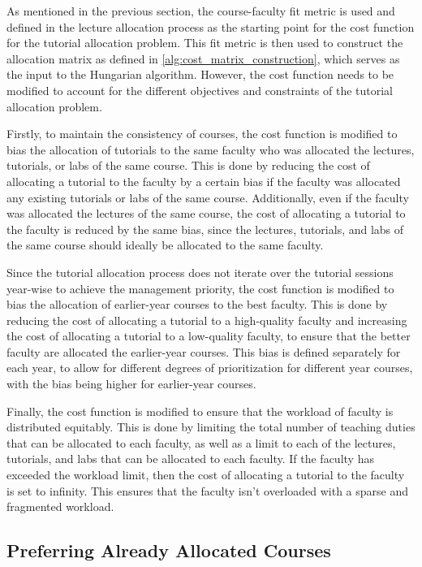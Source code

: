 As mentioned in the previous section, the course-faculty fit metric is used and defined in the lecture allocation process as the starting point for the cost function for the tutorial allocation problem. This fit metric is then used to construct the allocation matrix as defined in \autoref{alg:cost_matrix_construction}, which serves as the input to the Hungarian algorithm. However, the cost function needs to be modified to account for the different objectives and constraints of the tutorial allocation problem.

Firstly, to maintain the consistency of courses, the cost function is modified to bias the allocation of tutorials to the same faculty who was allocated the lectures, tutorials, or labs of the same course. This is done by reducing the cost of allocating a tutorial to the faculty by a certain bias if the faculty was allocated any existing tutorials or labs of the same course. Additionally, even if the faculty was allocated the lectures of the same course, the cost of allocating a tutorial to the faculty is reduced by the same bias, since the lectures, tutorials, and labs of the same course should ideally be allocated to the same faculty.

Since the tutorial allocation process does not iterate over the tutorial sessions year-wise to achieve the management priority, the cost function is modified to bias the allocation of earlier-year courses to the best faculty. This is done by reducing the cost of allocating a tutorial to a high-quality faculty and increasing the cost of allocating a tutorial to a low-quality faculty, to ensure that the better faculty are allocated the earlier-year courses. This bias is defined separately for each year, to allow for different degrees of prioritization for different year courses, with the bias being higher for earlier-year courses.

Finally, the cost function is modified to ensure that the workload of faculty is distributed equitably. This is done by limiting the total number of teaching duties that can be allocated to each faculty, as well as a limit to each of the lectures, tutorials, and labs that can be allocated to each faculty. If the faculty has exceeded the workload limit, then the cost of allocating a tutorial to the faculty is set to infinity. This ensures that the faculty isn't overloaded with a sparse and fragmented workload.

\subsection{Preferring Already Allocated Courses}

